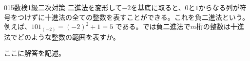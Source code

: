 \begin{prob}{015}{}{数検1級二次対策}
 二進法を変形して$-2$を基底に取ると、$0$と$1$からなる列が符号をつけずに十進法の全ての整数を表すことができる。これを負二進法という。例えば、$101_{(-2)}=(-2)^2+1=5$ である。では負二進法で$m$桁の整数は十進法でどのような整数の範囲を表すか。
\end{prob}
ここに解答を記述。
